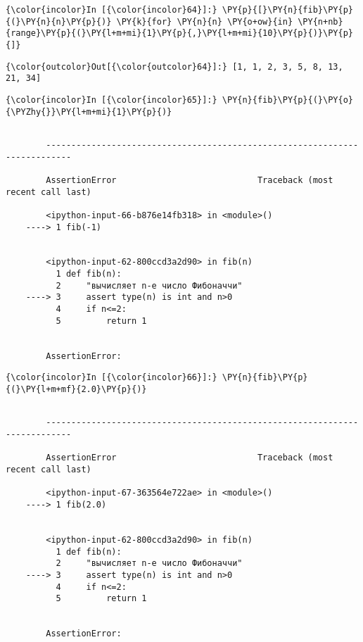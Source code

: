     \begin{Verbatim}[commandchars=\\\{\}]
{\color{incolor}In [{\color{incolor}64}]:} \PY{p}{[}\PY{n}{fib}\PY{p}{(}\PY{n}{n}\PY{p}{)} \PY{k}{for} \PY{n}{n} \PY{o+ow}{in} \PY{n+nb}{range}\PY{p}{(}\PY{l+m+mi}{1}\PY{p}{,}\PY{l+m+mi}{10}\PY{p}{)}\PY{p}{]}
\end{Verbatim}

            \begin{Verbatim}[commandchars=\\\{\}]
{\color{outcolor}Out[{\color{outcolor}64}]:} [1, 1, 2, 3, 5, 8, 13, 21, 34]
\end{Verbatim}
        
    \begin{Verbatim}[commandchars=\\\{\}]
{\color{incolor}In [{\color{incolor}65}]:} \PY{n}{fib}\PY{p}{(}\PY{o}{\PYZhy{}}\PY{l+m+mi}{1}\PY{p}{)}
\end{Verbatim}

    \begin{Verbatim}[commandchars=\\\{\}]

        ---------------------------------------------------------------------------

        AssertionError                            Traceback (most recent call last)

        <ipython-input-66-b876e14fb318> in <module>()
    ----> 1 fib(-1)
    

        <ipython-input-62-800ccd3a2d90> in fib(n)
          1 def fib(n):
          2     "вычисляет n-е число Фибоначчи"
    ----> 3     assert type(n) is int and n>0
          4     if n<=2:
          5         return 1


        AssertionError: 

    \end{Verbatim}

    \begin{Verbatim}[commandchars=\\\{\}]
{\color{incolor}In [{\color{incolor}66}]:} \PY{n}{fib}\PY{p}{(}\PY{l+m+mf}{2.0}\PY{p}{)}
\end{Verbatim}

    \begin{Verbatim}[commandchars=\\\{\}]

        ---------------------------------------------------------------------------

        AssertionError                            Traceback (most recent call last)

        <ipython-input-67-363564e722ae> in <module>()
    ----> 1 fib(2.0)
    

        <ipython-input-62-800ccd3a2d90> in fib(n)
          1 def fib(n):
          2     "вычисляет n-е число Фибоначчи"
    ----> 3     assert type(n) is int and n>0
          4     if n<=2:
          5         return 1


        AssertionError: 

    \end{Verbatim}
